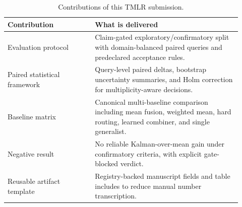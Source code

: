 \begin{table}[t]
\centering
\caption{Contributions of this TMLR submission.}
\label{tab:contrib}
\begin{tabular}{p{0.34\linewidth}p{0.58\linewidth}}
\toprule
Contribution & What is delivered \\
\midrule
Evaluation protocol & Claim-gated exploratory/confirmatory split with domain-balanced paired queries and predeclared acceptance rules. \\
Paired statistical framework & Query-level paired deltas, bootstrap uncertainty summaries, and Holm correction for multiplicity-aware decisions. \\
Baseline matrix & Canonical multi-baseline comparison including mean fusion, weighted mean, hard routing, learned combiner, and single generalist. \\
Negative result & No reliable Kalman-over-mean gain under confirmatory criteria, with explicit gate-blocked verdict. \\
Reusable artifact template & Registry-backed manuscript fields and table includes to reduce manual number transcription. \\
\bottomrule
\end{tabular}
\end{table}
